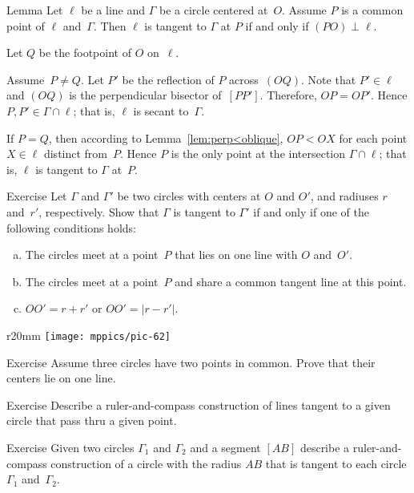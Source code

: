 \begin{thm}[\abs]{Lemma}\label{lem:tangent}
Let $\ell$ be a line and $\Gamma$ be a circle centered at~$O$.
Assume $P$ is a common point of $\ell$ and~$\Gamma$. 
Then $\ell$ is tangent to $\Gamma$ at $P$ if and only if $(PO)\perp \ell$.
\end{thm}

Let $Q$ be the footpoint of $O$ on~$\ell$.

Assume~$P\ne Q$.
Let $P'$ be the reflection of $P$ across~$(OQ)$.
Note that $P'\in\ell$ and $(OQ)$ is the perpendicular bisector of~$[PP']$.
Therefore, $OP=OP'$.
Hence $P,P'\in \Gamma\cap \ell$;
that is, $\ell$ is secant to~$\Gamma$.

If $P=Q$, 
then according to Lemma~\ref{lem:perp<oblique},
$OP<OX$ for each point $X\in \ell$ distinct from~$P$.
Hence $P$ is the only point at the intersection $\Gamma\cap\ell$;
that is, $\ell$ is tangent to $\Gamma$ at~$P$. 
\qeds

\begin{thm}{Exercise}\label{ex:tangent-circles}
Let $\Gamma$ and $\Gamma'$ be two circles with centers at $O$ and $O'$, and radiuses $r$ and~$r'$, respectively.
Show that $\Gamma$ is tangent to $\Gamma'$ if and only if one of the following conditions holds:
\begin{enumerate}[(a)]
\item\label{ex:tangent-circles:a} The circles meet at a point~$P$ that lies on one line with $O$ and~$O'$.
\item\label{ex:tangent-circles:b} The circles meet at a point~$P$ and share a common tangent line at this point.
\item\label{ex:tangent-circles-2} $OO' = r + r'$ or $OO' = |r - r'|$.
\end{enumerate}

\end{thm}


{

\begin{wrapfigure}{r}{20mm}
\vskip-10mm
\centering
\texttt{[image: mppics/pic-62]}
\end{wrapfigure}

\begin{thm}{Exercise}\label{ex:tangent-circles-3}
Assume three circles have two points in common.
Prove that their centers lie on one line.
\end{thm}

}

\begin{thm}{Exercise}\label{ex:tangent}
Describe a ruler-and-compass construction of lines tangent to a given circle that pass thru a given point.
\end{thm}

\begin{thm}{Exercise}\label{ex:tangent-circle}
Given two circles $\Gamma_1$ and $\Gamma_2$ and a segment $[AB]$
describe a ruler-and-compass construction of a circle with the radius $AB$
that is tangent to each circle $\Gamma_1$ and~$\Gamma_2$.
\end{thm}
